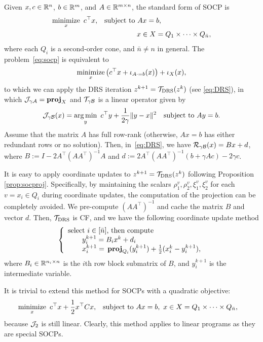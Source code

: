 {{{Given $x,c\in\mathbb{R}^n$, $b\in\mathbb{R}^m$, and $A\in\mathbb{R}^{m\times n}$, the standard form of SOCP is
\begin{subequations}\label{eq:socp}
\begin{align}
\Min_x~c^\top x,&\quad\St~ Ax=b,\\
&\hspace{56pt} x\in X=Q_1\times \cdots\times Q_{\bar{n}},
\end{align}
\end{subequations}
where each $Q_i$ is a second-order cone, and $\bar{n}\not=n$ in general.
The problem~\eqref{eq:socp} is equivalent to
$$\operatorname*{minimize}_x \big(c^\top  x+\iota_{A\cdot =b}(x)\big)+\iota_X(x),$$
to which we can apply the DRS iteration $z^{k+1} = {{\mathcal{T}}_{\mathrm{DRS}}} (z^k)$ (see \eqref{eq:DRS}), in which ${\mathcal{J}}_{\gamma {\mathcal{A}}} = {\mathbf{proj}}_X$ and ${\mathcal{T}}_{\gamma {\mathcal{B}}}$ is a linear operator given by
$${\mathcal{J}}_{\gamma {\mathcal{B}}} (x) = \operatorname*{arg\,min}_y ~ c^\top y+  \frac{1}{2\gamma}\|y-x\|^2\quad {\mathrm{subject~to}}~ Ay=b.$$
Assume that the matrix $A$ has full row-rank (otherwise, $Ax=b$ has either redundant rows or no solution).
Then, in~\eqref{eq:DRS}, we have ${\mathcal{R}}_{\gamma {\mathcal{B}}}(x)= Bx+d$, where $B:=I-2A^\top (AA^\top )^{-1}A$ and $d:=2A^\top (AA^\top )^{-1}(b+\gamma Ac)-2\gamma c$.

It is easy to apply coordinate updates to $z^{k+1} = {{\mathcal{T}}_{\mathrm{DRS}}} (z^k)$ following Proposition \ref{prop:socproj}. Specifically, by maintaining the scalars $\rho_1^v,\rho_2^v,\xi_1^v,\xi_2^v$ for each $v=x_i\in Q_i$ during  coordinate updates, the computation of the projection can be completely avoided. We pre-compute $(AA^\top )^{-1}$ and cache the matrix $B$ and vector $d$. Then, ${{\mathcal{T}}_{\mathrm{DRS}}}$ is CF, and we have the following coordinate update method
\begin{equation}\label{cf-cone}
{\left\{
\begin{array}{l}
\text{select $i \in [\bar{n}]$, then compute}\\
\qquad y^{k+1}_i = B_i x^k + d_i \\
\qquad x_i^{k+1}=\,\prj_{Q_i}(y_i^{k+1}) + \frac{1}{2} ( x_i^k - y_i^{k+1}), \\
\end{array}
\right.
}\end{equation}
where $B_i \in \mathbb{R}^{n_i \times n}$ is the $i$th row block submatrix of $B$, and $y_i^{k+1}$ is the intermediate variable.


It is trivial to extend this method for  SOCPs with a quadratic objective:
\begin{align*}
\Min_x~c^\top x+\frac{1}{2}x^\top Cx,&\quad\St~ Ax=b,~ x\in X=Q_1\times \cdots\times Q_{\bar{n}},
\end{align*}
because ${\mathcal{J}}_2$ is still linear.  Clearly, this method applies to linear programs as they are special SOCPs.

}}}
